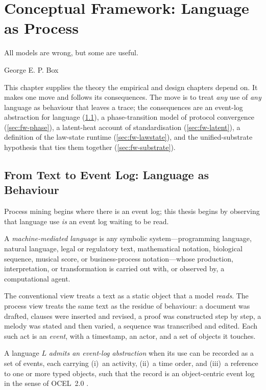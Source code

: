 \chapter{Conceptual Framework: Language as Process}
\label{ch:framework}

\epigraph{All models are wrong, but some are useful.}{George E. P. Box}

This chapter supplies the theory the empirical and design chapters depend on. It
makes one move and follows its consequences. The move is to treat \emph{any} use
of \emph{any} language as behaviour that leaves a trace; the consequences are an
event-log abstraction for language (\cref{sec:fw-eventlog}), a phase-transition
model of protocol convergence (\cref{sec:fw-phase}), a latent-heat account of
standardisation (\cref{sec:fw-latent}), a definition of the law-state runtime
(\cref{sec:fw-lawstate}), and the unified-substrate hypothesis that ties them
together (\cref{sec:fw-substrate}).

\section{From Text to Event Log: Language as Behaviour}
\label{sec:fw-eventlog}

Process mining begins where there is an event log; this thesis begins by
observing that language use \emph{is} an event log waiting to be read.

\begin{definition}
\label{def:mml}
A \emph{machine-mediated language} is any symbolic system---programming language,
natural language, legal or regulatory text, mathematical notation, biological
sequence, musical score, or business-process notation---whose production,
interpretation, or transformation is carried out with, or observed by, a
computational agent.
\end{definition}

The conventional view treats a text as a static object that a model
\emph{reads}. The process view treats the same text as the residue of
behaviour: a document was drafted, clauses were inserted and revised, a proof was
constructed step by step, a melody was stated and then varied, a sequence was
transcribed and edited. Each such act is an \emph{event}, with a timestamp, an
actor, and a set of objects it touches.

\begin{definition}
\label{def:eventlog}
A language $L$ \emph{admits an event-log abstraction} when its use can be
recorded as a set of events, each carrying (i)~an activity, (ii)~a time order,
and (iii)~a reference to one or more typed objects, such that the record is an
object-centric event log in the sense of OCEL~2.0 \citep{ocel2-2024}.
\end{definition}

